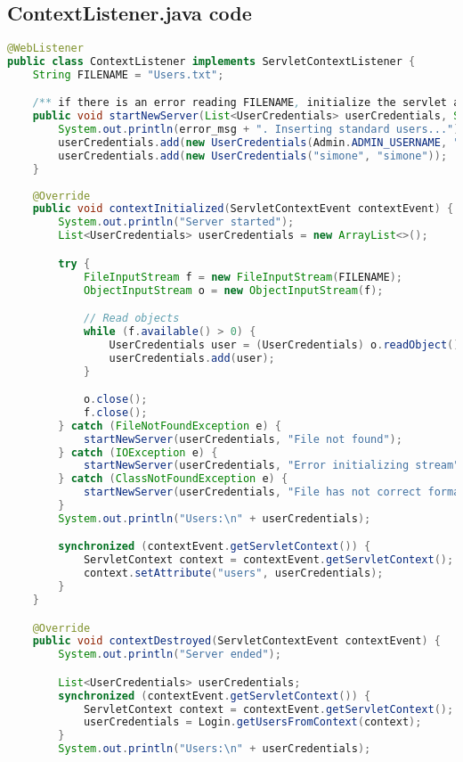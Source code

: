 \subsection{ContextListener.java code}
\begin{lstlisting}[language=java, caption={listener of context changes}]
@WebListener
public class ContextListener implements ServletContextListener {
    String FILENAME = "Users.txt";

    /** if there is an error reading FILENAME, initialize the servlet as new with standard users */
    public void startNewServer(List<UserCredentials> userCredentials, String error_msg) {
        System.out.println(error_msg + ". Inserting standard users...");
        userCredentials.add(new UserCredentials(Admin.ADMIN_USERNAME, "nimda"));
        userCredentials.add(new UserCredentials("simone", "simone"));
    }
    
    @Override
    public void contextInitialized(ServletContextEvent contextEvent) {
        System.out.println("Server started");
        List<UserCredentials> userCredentials = new ArrayList<>();

        try {
            FileInputStream f = new FileInputStream(FILENAME);
            ObjectInputStream o = new ObjectInputStream(f);

            // Read objects
            while (f.available() > 0) {
                UserCredentials user = (UserCredentials) o.readObject();
                userCredentials.add(user);
            }

            o.close();
            f.close();
        } catch (FileNotFoundException e) {
            startNewServer(userCredentials, "File not found");
        } catch (IOException e) {
            startNewServer(userCredentials, "Error initializing stream");
        } catch (ClassNotFoundException e) {
            startNewServer(userCredentials, "File has not correct format");
        }
        System.out.println("Users:\n" + userCredentials);

        synchronized (contextEvent.getServletContext()) {
            ServletContext context = contextEvent.getServletContext();
            context.setAttribute("users", userCredentials);
        }
    }

    @Override
    public void contextDestroyed(ServletContextEvent contextEvent) {
        System.out.println("Server ended");

        List<UserCredentials> userCredentials;
        synchronized (contextEvent.getServletContext()) {
            ServletContext context = contextEvent.getServletContext();
            userCredentials = Login.getUsersFromContext(context);
        }
        System.out.println("Users:\n" + userCredentials);


\end{lstlisting}
